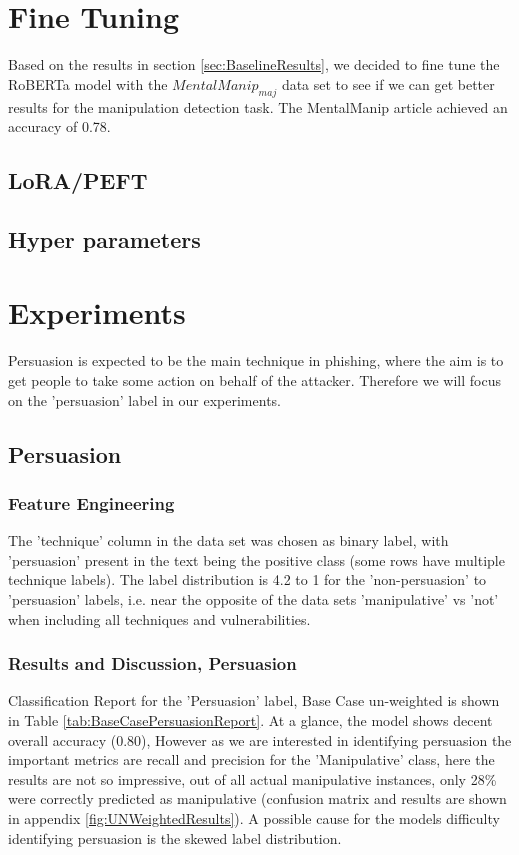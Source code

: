 \documentclass[
	letterpaper, %
	12pt, %
	unnumberedsections, %
	twoside, %
]{LTJournalArticle}
\begin{document}
\section{Fine Tuning}
Based on the results in section \ref{sec:BaselineResults}, we decided to fine tune the RoBERTa model with the $MentalManip_{maj}$ data set to see if we can get better results for the manipulation detection task. The MentalManip article\cite{MentalManip} achieved an accuracy of 0.78.

\subsection{LoRA/PEFT}
\subsection{Hyper parameters}







\section{Experiments}
Persuasion is expected to be the main technique in phishing, where the aim is to get people to take some action on behalf of the attacker. Therefore we will focus on the 'persuasion' label in our experiments.

\subsection{Persuasion}
\subsubsection{Feature Engineering}
The 'technique' column in the data set was chosen as binary label, with 'persuasion' present in the text being the positive class (some rows have multiple technique labels). The label distribution is 4.2 to 1 for the 'non-persuasion' to 'persuasion' labels, i.e. near the opposite of the data sets 'manipulative' vs 'not' when including all techniques and vulnerabilities.

\subsubsection{Results and Discussion, Persuasion}
Classification Report for the 'Persuasion' label, Base Case un-weighted is shown in Table \ref{tab:BaseCasePersuasionReport}. At a glance, the model shows decent overall accuracy (0.80), However as we are interested in identifying persuasion the important metrics are recall and precision for the 'Manipulative' class, here the results are not so impressive, out of all actual manipulative instances, only 28\% were correctly predicted as manipulative (confusion matrix and results are shown in appendix \ref{fig:UNWeightedResults}). A possible cause for the models difficulty identifying persuasion is the skewed label distribution.
\end{document}
